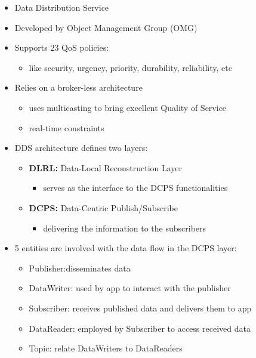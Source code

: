 \begin{itemize}
	\item Data Distribution Service
	\item Developed by Object Management Group (OMG)
	\item Supports 23 QoS policies:
	\begin{itemize}
		\item like security, urgency, priority, durability, reliability, etc
	\end{itemize}
	\item Relies on a broker-less architecture
	\begin{itemize}
		\item uses multicasting to bring excellent Quality of Service
		\item real-time constraints
	\end{itemize}
	\item DDS architecture defines two layers:
	\begin{itemize}
		\item \textbf{DLRL:} Data-Local Reconstruction Layer
		\begin{itemize}
			\item serves as the interface to the DCPS functionalities
		\end{itemize}
		\item \textbf{DCPS:} Data-Centric Publish/Subscribe
		\begin{itemize}
			\item delivering the information to the subscribers
		\end{itemize}
	\end{itemize}
	\item 5 entities are involved with the data flow in the DCPS layer:
	\begin{itemize}
		\item Publisher:disseminates data
		\item DataWriter: used by app to interact with the publisher
		\item Subscriber: receives published data and delivers them to app
		\item DataReader: employed by Subscriber to access received data
		\item Topic: relate DataWriters to DataReaders
	\end{itemize}
\end{itemize}
